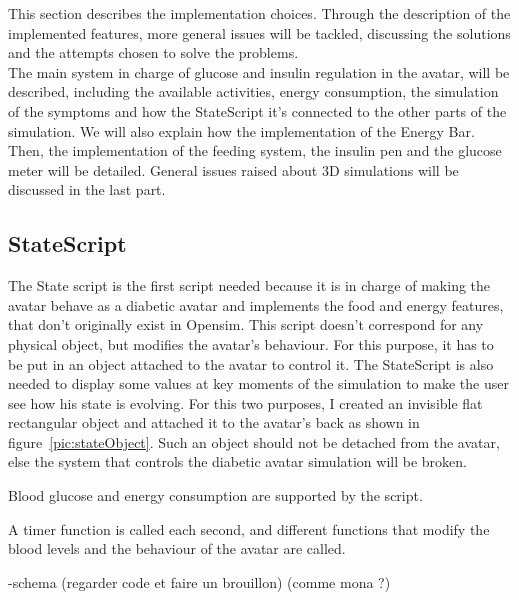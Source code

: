  
 This section describes the implementation choices. Through the description of the implemented features, more general issues will be tackled, discussing the solutions and the attempts chosen to solve the problems.\\

The main system in charge of glucose and insulin regulation in the avatar, will be described, including the available 
activities, 
energy consumption, the simulation of the 
symptoms and how the StateScript it's 
connected to the other parts of the simulation. We will also explain how the implementation of the 
Energy Bar. Then, the implementation of the 
feeding system, the insulin pen and the glucose meter will be detailed. 
General issues raised about 3D simulations will be discussed in the last part.

\subsection{StateScript}


The State script is the first script needed because it is in charge of making the avatar behave as a diabetic avatar and implements the food and energy features, that don't originally exist in Opensim. This script doesn't correspond for any physical object, but modifies the avatar's behaviour. For this purpose, it has to be put in an object attached to the avatar to control it.  
The StateScript is also needed to display some values at key moments of the simulation to make the user see how his state is evolving. For this two purposes, I created an invisible flat rectangular object and attached it to the avatar's back as shown in figure~\ref{pic:stateObject}. 
%
Such an object should not be detached from the avatar, else the system that controls the diabetic avatar simulation will be broken.

Blood glucose and energy consumption are supported by the script.%

A timer function is called each second, and different functions that modify the blood levels and the behaviour of the avatar are called.

-schema (regarder code et faire un brouillon) (comme mona ?)

